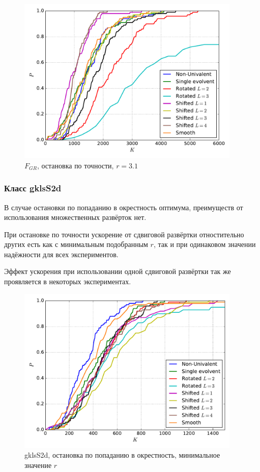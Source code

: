 \documentclass[a4paper]{article}
\begin{document}
\begin{figure}[H]
  \center
  \includegraphics[width=0.95\textwidth]{../f_gr/same_r/accuracy/grish_same_r_acc.pdf}
  \caption{$F_{GR}$, остановка по точности, $r=3.1$}
  \label{fig:}
\end{figure}

\subsubsection{Класс gklsS2d}
В случае остановки по попаданию в окрестность оптимума, преимуществ от использования
множественных развёрток нет.

При остановке по точности ускорение от сдвиговой развёртки отностительно других есть
как с минимальным подобранным $r$, так и при одинаковом значении надёжности для всех
экспериментов.

Эффект ускорения при использовании одной сдвиговой развёртки так же проявляется в некоторых экспериментах.

\begin{figure}
  \center
  \includegraphics[width=0.95\textwidth]{../gklsS2d/opt_point/gklsS2d_opt_pt_op.pdf}
  \caption{gklsS2d, остановка по попаданию в окрестность, минимальное значение $r$}
  \label{fig:}
\end{figure}
\end{document}
